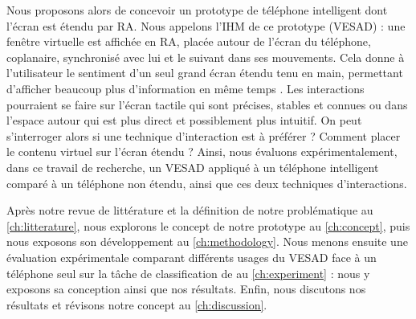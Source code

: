 Nous proposons alors de concevoir un prototype de téléphone intelligent dont l'écran est étendu par RA. Nous appelons l'IHM de ce prototype  (VESAD) : une fenêtre virtuelle est affichée en RA, placée autour de l'écran du téléphone, coplanaire, synchronisé avec lui et le suivant dans ses mouvements. Cela donne à l'utilisateur le sentiment d'un seul grand écran étendu tenu en main, permettant d'afficher beaucoup plus d'information en même temps . Les interactions pourraient se faire sur l'écran tactile qui sont précises, stables et connues ou dans l'espace autour qui est plus direct et possiblement plus intuitif. On peut s'interroger alors si une technique d'interaction est à préférer ? Comment placer le contenu virtuel sur l'écran étendu ? Ainsi, nous évaluons expérimentalement, dans ce travail de recherche, un VESAD appliqué à un téléphone intelligent comparé à un téléphone non étendu, ainsi que ces deux techniques d'interactions.

Après notre revue de littérature et la définition de notre problématique au \autoref{ch:litterature}, nous explorons le concept de notre prototype au \autoref{ch:concept}, puis nous exposons son développement au \autoref{ch:methodology}. Nous menons ensuite une évaluation expérimentale comparant différents usages du VESAD face à un téléphone seul sur la tâche de classification de \cite{Liu2014} au \autoref{ch:experiment} : nous y exposons sa conception ainsi que nos résultats. Enfin, nous discutons nos résultats et révisons notre concept au \autoref{ch:discussion}.